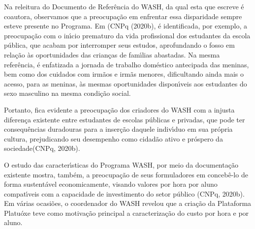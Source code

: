 \documentclass[
12pt,		%
openright,	%
twoside,  %
a4paper,			%
chapter=TITLE,		%
english,			%
french,				%
spanish,			%
brazil				%
]{USPSC-classe/USPSC}
\begin{document}
Na releitura do Documento de Refer\^encia do WASH, da qual esta que escreve \'e coautora, observamos que a preocupa\c{c}\~ao em enfrentar essa disparidade sempre esteve presente no Programa. Em  (CNPq (2020b), \'e identificada, por exemplo, a preocupa\c{c}\~ao com o in\'{\i}cio prematuro da vida profissional dos estudantes da escola p\'ublica, que acabam por interromper seus estudos, aprofundando o fosso em rela\c{c}\~ao \`as oportunidades das crian\c{c}as de fam\'{\i}lias abastadas. Na mesma refer\^encia, \'e enfatizada a jornada de trabalho dom\'estico antecipada  das meninas, bem como dos cuidados com irm\~aos e irm\~as menores, dificultando ainda mais o acesso, para as meninas, \`as mesmas oportunidades dispon\'{\i}veis aos estudantes do sexo masculino na mesma condi\c{c}\~ao social.









Portanto, fica evidente a preocupa\c{c}\~ao dos criadores do WASH com a \textquotedbl injusta diferen\c{c}a existente entre estudantes de escolas p\'ublicas e privadas, que pode ter consequ\^encias duradouras para a inser\c{c}\~ao daquele indiv\'{\i}duo em sua pr\'opria cultura, prejudicando seu desempenho como cidad\~ao ativo e pr\'ospero da sociedade\textquotedbl  (CNPq, 2020b).










\noindent\begin{center}\mbox{\centering{}}\end{center}


O estudo das caracter\'{\i}sticas do Programa WASH, por meio da documenta\c{c}\~ao existente mostra, tamb\'em, a preocupa\c{c}\~ao de seus formuladores em conceb\^e-lo de forma sustent\'avel economicamente, visando valores por hora por aluno compat\'{\i}veis com a capacidade de investimento do setor p\'ublico  (CNPq, 2020b). Em v\'arias ocasi\~oes, o coordenador do WASH revelou que a cria\c{c}\~ao da Plataforma Platu\'oxe teve como motiva\c{c}\~ao principal a caracteriza\c{c}\~ao do custo por hora e por aluno.
\end{document}
